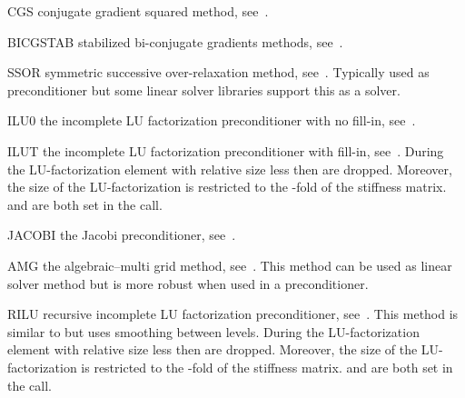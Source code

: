 \begin{memberdesc}[LinearPDE]{CGS}
conjugate gradient squared method, see~.
\end{memberdesc}

\begin{memberdesc}[LinearPDE]{BICGSTAB}
stabilized bi-conjugate gradients methods, see~.
\end{memberdesc}

\begin{memberdesc}[LinearPDE]{SSOR}
symmetric successive over-relaxation method, see~. Typically used as preconditioner but some linear solver libraries support
this as a solver.
\end{memberdesc}
\begin{memberdesc}[LinearPDE]{ILU0}
the incomplete LU factorization preconditioner with no fill-in, see~.
\end{memberdesc}

\begin{memberdesc}[LinearPDE]{ILUT}
the incomplete LU factorization preconditioner with fill-in, see~. During the  LU-factorization element with
relative size less then  are dropped. Moreover, the size of the LU-factorization is restricted to the
-fold of the stiffness matrix.  and  are both set in the
 call.
\end{memberdesc}

\begin{memberdesc}[LinearPDE]{JACOBI}
the Jacobi preconditioner, see~.
\end{memberdesc}

\begin{memberdesc}[LinearPDE]{AMG}
the algebraic--multi grid method, see~. This method can be used as linear solver method but is more robust when used
in a preconditioner.
\end{memberdesc}

\begin{memberdesc}[LinearPDE]{RILU}
recursive incomplete LU factorization preconditioner, see~. This method is similar to \ILUT but uses smoothing
between levels. During the  LU-factorization element with
relative size less then  are dropped. Moreover, the size of the LU-factorization is restricted to the
-fold of the stiffness matrix.  and  are both set in the
 call.
\end{memberdesc}

